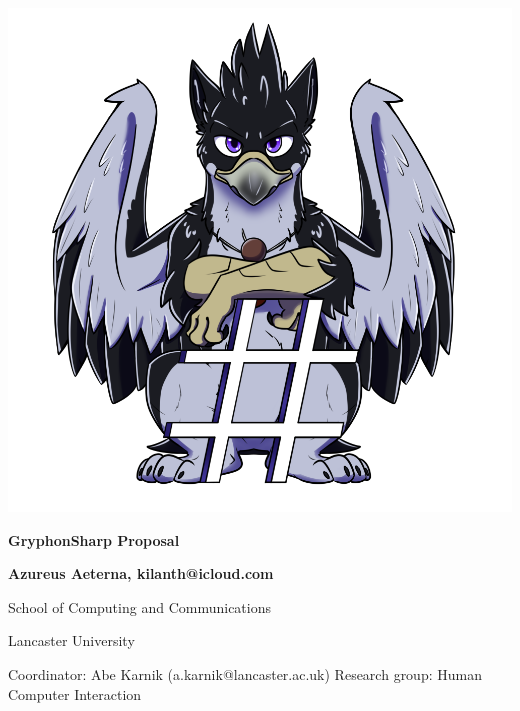 \documentclass{article}
\begin{document}
\begin{titlepage}

    \center
    
    \includegraphics[scale=0.5]{AzuGryphonSharp.png} %
    
    \huge  \textbf{GryphonSharp Proposal}
    
    \vspace{2cm}
    
    \Large \textbf{Azureus Aeterna, kilanth@icloud.com}
    
    School of Computing and Communications
    
    Lancaster University
    
    \vfill
    
    Coordinator: Abe Karnik (a.karnik@lancaster.ac.uk)\endgraf
    Research group: Human Computer Interaction
    
    \end{titlepage}
\pagebreak
\end{document}
